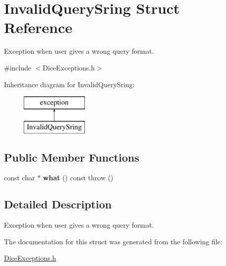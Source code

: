 \hypertarget{struct_invalid_query_sring}{}\section{Invalid\+Query\+Sring Struct Reference}
\label{struct_invalid_query_sring}


Exception when user gives a wrong query format.  




{\ttfamily \#include $<$Dice\+Exceptions.\+h$>$}

Inheritance diagram for Invalid\+Query\+Sring\+:\begin{figure}[H]
\begin{center}
\leavevmode
\includegraphics[height=2.000000cm]{struct_invalid_query_sring}
\end{center}
\end{figure}
\subsection*{Public Member Functions}
\begin{DoxyCompactItemize}
\item 
\hypertarget{struct_invalid_query_sring_a7f34d809690955b187bc91f6b37064a6}{}\label{struct_invalid_query_sring_a7f34d809690955b187bc91f6b37064a6} 
const char $\ast$ {\bfseries what} () const  throw ()
\end{DoxyCompactItemize}


\subsection{Detailed Description}
Exception when user gives a wrong query format. 

The documentation for this struct was generated from the following file\+:\begin{DoxyCompactItemize}
\item 
\hyperlink{_dice_exceptions_8h}{Dice\+Exceptions.\+h}\end{DoxyCompactItemize}
